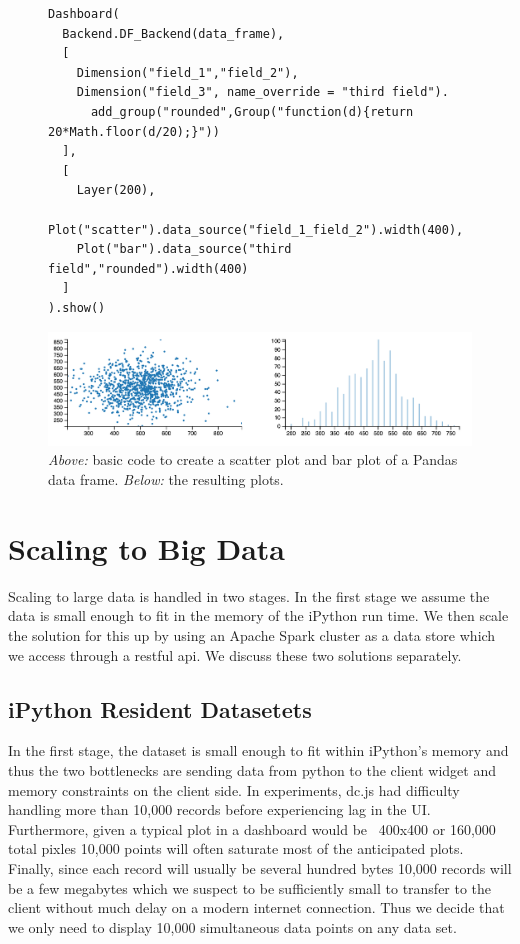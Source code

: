 \documentclass[letter,twocolumn]{article}
\begin{document}
\begin{figure}[hb]
\begin{lstlisting}
Dashboard(
  Backend.DF_Backend(data_frame), 
  [
    Dimension("field_1","field_2"),
    Dimension("field_3", name_override = "third field").
      add_group("rounded",Group("function(d){return 20*Math.floor(d/20);}"))
  ],
  [
    Layer(200),
    Plot("scatter").data_source("field_1_field_2").width(400),
    Plot("bar").data_source("third field","rounded").width(400)
  ]
).show()
\end{lstlisting}

\includegraphics[scale=.63]{figs/screenshot_scatter_bar.png}
  \caption{\emph{Above:} basic code to create a scatter plot and bar plot of a Pandas data frame.  \emph{Below:} the resulting plots.}\label{fig:simple_example}
\end{figure}

\section{Scaling to Big Data}\label{sec:bigdata}%
Scaling to large data is handled in two stages.  In the first stage we assume the data is small enough to fit in the memory of the iPython run time.  We then scale the solution for this up by using an Apache Spark cluster as a data store which we access through a restful api.  We discuss these two solutions separately.

\subsection{iPython Resident Datasetets}
In the first stage, the dataset is small enough to fit within iPython's memory and thus the two bottlenecks are sending data from python to the client widget and memory constraints on the client side.
In experiments, dc.js had difficulty handling more than 10,000 records before experiencing lag in the UI.
Furthermore, given a typical plot in a dashboard would be ~400x400 or 160,000 total pixles 10,000 points will often saturate most of the anticipated plots.  
Finally, since each record will usually be several hundred bytes 10,000 records will be a few megabytes which we suspect to be sufficiently small to transfer to the client without much delay on a modern internet connection.
Thus we decide that we only need to display 10,000 simultaneous data points on any data set.
\end{document}
